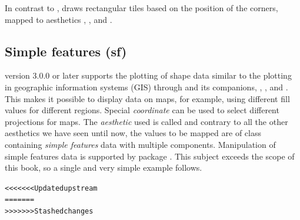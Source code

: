\documentclass[krantz2]{krantz}\usepackage{knitr}
\begin{document}
In contrast to ,  draws rectangular tiles based on the position of the corners, mapped to aesthetics , ,  and .


\subsection{Simple features (sf)}\label{sec:plot:sf}

\ggplot version 3.0.0 or later supports the plotting of shape data similar to the plotting in geographic information systems (GIS) through  and its companions, , , and . This makes it possible to display data on maps, for example, using different fill values for different regions. Special \emph{coordinate}  can be used to select different projections for maps. The \emph{aesthetic} used is called  and contrary to all the other aesthetics we have seen until now, the values to be mapped are of class  containing \emph{simple features} data with multiple components. Manipulation of simple features data is supported by package . This subject exceeds the scope of this book, so a single and very simple example follows.

\begin{knitrout}\footnotesize
{}\color{fgcolor}\begin{kframe}
\begin{alltt}
 \hlkwb{<-} \hlopt{::}\hlstd{(}\hlstd{(}\hlstd{,}  \hlstd{=} \hlstd{),}  \hlstd{=} \hlstd{)}
<<<<<<< Updated upstream
 \hlopt{+}
  \hlstd{(}\hlstd{(}   \hlstd{=} \hlstd{)}
=======
>>>>>>> Stashed changes
\end{alltt}


{\ttfamily\noindent\bfseries\color{errorcolor}{\#\# Error in loadNamespace(name): there is no package called 'sf'}}\begin{alltt}
 \hlopt{+}
  \hlstd{(}\hlstd{(}   \hlstd{=} \hlstd{)}
\end{alltt}


{\ttfamily\noindent\bfseries\color{errorcolor}{\#\# Error in ggplot(nc): object 'nc' not found}}\end{kframe}
\end{knitrout}
\end{document}
